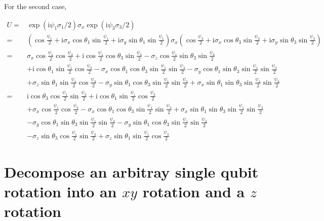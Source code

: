 \documentclass[10pt,fleqn]{article}
\newcommand{\ui}{\mathrm{i}}
\newcommand{\eqar}[1]
{
  \begin{align*}
    #1
  \end{align*}
}
\newcommand{\paren}[1]{{\left({#1}\right)}}
\begin{document}
For the second case,
\eqar{
  U=&\exp\paren{\ui\psi_1\sigma_1/2}\sigma_x\exp\paren{\ui\psi_3\sigma_3/2}\\
  =&\paren{\cos\frac{\psi_1}{2}+\ui\sigma_x\cos\theta_1\sin\frac{\psi_1}{2}+\ui\sigma_y\sin\theta_1\sin\frac{\psi_1}{2}}\sigma_x\paren{\cos\frac{\psi_3}{2}+\ui\sigma_x\cos\theta_3\sin\frac{\psi_3}{2}+\ui\sigma_y\sin\theta_3\sin\frac{\psi_3}{2}}\\
  =&\sigma_x\cos\frac{\psi_1}{2}\cos\frac{\psi_3}{2}+\ui\cos\frac{\psi_1}{2}\cos\theta_3\sin\frac{\psi_3}{2}-\sigma_z\cos\frac{\psi_1}{2}\sin\theta_3\sin\frac{\psi_3}{2}\\
  &+\ui\cos\theta_1\sin\frac{\psi_1}{2}\cos\frac{\psi_3}{2}-\sigma_x\cos\theta_1\cos\theta_3\sin\frac{\psi_1}{2}\sin\frac{\psi_3}{2}-\sigma_y\cos\theta_1\sin\theta_3\sin\frac{\psi_1}{2}\sin\frac{\psi_3}{2}\\
  &+\sigma_z\sin\theta_1\sin\frac{\psi_1}{2}\cos\frac{\psi_3}{2}-\sigma_y\sin\theta_1\cos\theta_3\sin\frac{\psi_1}{2}\sin\frac{\psi_3}{2}+\sigma_x\sin\theta_1\sin\theta_3\sin\frac{\psi_1}{2}\sin\frac{\psi_3}{2}\\
  =&\ui\cos\theta_3\cos\frac{\psi_1}{2}\sin\frac{\psi_3}{2}+\ui\cos\theta_1\sin\frac{\psi_1}{2}\cos\frac{\psi_3}{2}\\
  &+\sigma_x\cos\frac{\psi_1}{2}\cos\frac{\psi_3}{2}-\sigma_x\cos\theta_1\cos\theta_3\sin\frac{\psi_1}{2}\sin\frac{\psi_3}{2}+\sigma_x\sin\theta_1\sin\theta_3\sin\frac{\psi_1}{2}\sin\frac{\psi_3}{2}\\
  &-\sigma_y\cos\theta_1\sin\theta_3\sin\frac{\psi_1}{2}\sin\frac{\psi_3}{2}-\sigma_y\sin\theta_1\cos\theta_3\sin\frac{\psi_1}{2}\sin\frac{\psi_3}{2}\\
  &-\sigma_z\sin\theta_3\cos\frac{\psi_1}{2}\sin\frac{\psi_3}{2}+\sigma_z\sin\theta_1\sin\frac{\psi_1}{2}\cos\frac{\psi_3}{2}
}

\clearpage
\appendix
\section{Decompose an arbitray single qubit rotation into an $xy$ rotation
  and a $z$ rotation}
\end{document}
